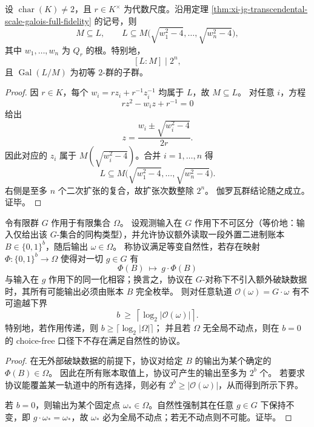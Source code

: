 \begin{proposition}[代数尺度下的二元纤维上界]\label{prop:xi-jg-algebraic-scale-binary-fiber-bound}
设 \(\operatorname{char}(K)\neq 2\)，且 \(r\in K^\times\) 为代数尺度。沿用定理
\ref{thm:xi-jg-transcendental-scale-galois-full-fidelity}
的记号，则
\[
M\subseteq L,\qquad
L\subseteq M\bigl(\sqrt{w_1^2-4},\dots,\sqrt{w_n^2-4}\bigr),
\]
其中 \(w_1,\dots,w_n\) 为 \(Q_r\) 的根。特别地，
\[
[L:M]\mid 2^n,
\]
且 \(\operatorname{Gal}(L/M)\) 为初等 \(2\)-群的子群。
\end{proposition}
\begin{proof}
因 \(r\in K\)，每个 \(w_i=r z_i+r^{-1}z_i^{-1}\) 均属于 \(L\)，故 \(M\subseteq L\)。
对任意 \(i\)，方程
\[
r z^2-w_i z+r^{-1}=0
\]
给出
\[
z=\frac{w_i\pm \sqrt{w_i^2-4}}{2r}.
\]
因此对应的 \(z_i\) 属于 \(M(\sqrt{w_i^2-4})\)。合并 \(i=1,\dots,n\) 得
\[
L\subseteq M\bigl(\sqrt{w_1^2-4},\dots,\sqrt{w_n^2-4}\bigr).
\]
右侧是至多 \(n\) 个二次扩张的复合，故扩张次数整除 \(2^n\)。
伽罗瓦群结论随之成立。证毕。
\end{proof}

\begin{theorem}[群作用下的二值跳跃选择与账本不可约下界]\label{thm:xi-equivariant-binary-jump-ledger-lower-bound}
令有限群 \(G\) 作用于有限集合 \(\Omega\)。
设观测输入在 \(G\) 作用下不可区分（等价地：输入仅给出该 \(G\)-集合的同构类型），并允许协议额外读取一段外置二进制账本 \(B\in\{0,1\}^b\)，随后输出 \(\omega\in\Omega\)。
称协议满足等变自然性，若存在映射 \(\Phi:\{0,1\}^b\to\Omega\) 使得对一切 \(g\in G\) 有
\[
\Phi(B)\ \mapsto\ g\cdot \Phi(B)
\]
与输入在 \(g\) 作用下的同一化相容；换言之，协议在 \(G\)-对称下不引入额外破缺数据时，其所有可能输出必须由账本 \(B\) 完全枚举。
则对任意轨道 \(\mathcal O(\omega)=G\cdot\omega\) 有不可逾越下界
\[
\boxed{\;b\ \ge\ \left\lceil \log_2|\mathcal O(\omega)|\right\rceil.\;}
\]
特别地，若作用传递，则 \(b\ge \lceil\log_2|\Omega|\rceil\)；
并且若 \(\Omega\) 无全局不动点，则在 \(b=0\) 的 choice-free 口径下不存在满足自然性的协议。
\end{theorem}
\begin{proof}
在无外部破缺数据的前提下，协议对给定 \(B\) 的输出为某个确定的 \(\Phi(B)\in\Omega\)。
因此在所有账本取值上，协议可产生的输出至多为 \(2^b\) 个。
若要求协议能覆盖某一轨道中的所有选择，则必有 \(2^b\ge |\mathcal O(\omega)|\)，从而得到所示下界。
\par
若 \(b=0\)，则输出为某个固定点 \(\omega_\ast\in\Omega\)。自然性强制其在任意 \(g\in G\) 下保持不变，即 \(g\cdot\omega_\ast=\omega_\ast\)，故 \(\omega_\ast\) 必为全局不动点；若无不动点则不可能。证毕。
\end{proof}

